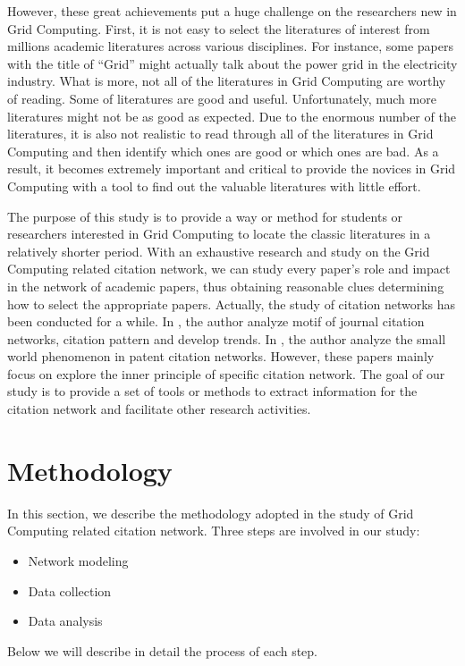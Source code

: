 However, these great achievements put a huge challenge on the researchers new in Grid Computing. First, it is not easy to select the literatures of interest from millions academic literatures across various disciplines. For instance, some papers with the title of ``Grid'' might actually talk about the power grid in the electricity industry. What is more, not all of the literatures in Grid Computing are worthy of reading. Some of literatures are good and useful. Unfortunately, much more literatures might not be as good as expected.  Due to the enormous number of the literatures, it is also not realistic to read through all of the literatures in Grid Computing and then identify which ones are good or which ones are bad.  As a result, it becomes extremely important and critical to provide the novices in Grid Computing with a tool to find out the valuable literatures with little effort. 

The purpose of this study is to provide a way or method for students or researchers interested in Grid Computing to locate the classic literatures in a relatively shorter period. With an exhaustive research and study on the Grid Computing related citation network,  we can study every paper's role and impact in the network of academic papers, thus obtaining reasonable clues determining how to select the appropriate papers. Actually, the study of citation networks has been conducted for a while. In \cite{wu2008topology}, the author analyze motif of journal citation networks, citation pattern and develop trends. In \cite{hung2008small}, the author analyze the small world phenomenon in patent citation networks. However, these papers mainly focus on explore the inner principle of specific citation network. The goal of our study is to provide a set of tools or methods to extract information for the citation network and facilitate other research activities. 


\section{Methodology \label{S:Methodology}}
In this section, we describe the methodology adopted in the study of Grid Computing related citation network.  Three steps are involved in our study:
\begin{itemize}
\item Network modeling
\item Data collection
\item Data analysis
\end{itemize} 
Below we will describe in detail the process of each step.
